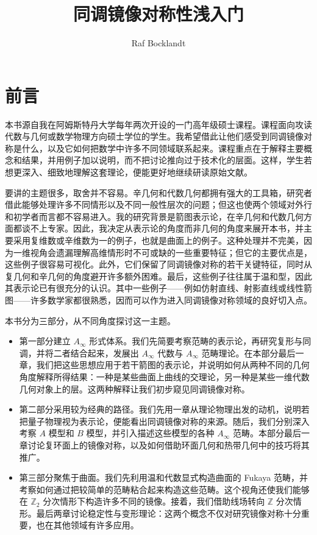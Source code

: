 \documentclass[lang=cn,cm,11pt,scheme=chinese]{elegantbook}
\title{同调镜像对称性浅入门}
\author{Raf Bocklandt}
\date{}
\begin{document}
\maketitle
\hypersetup{pageanchor=true}
\frontmatter
\tableofcontents

\chapter*{前言}
本书源自我在阿姆斯特丹大学每年两次开设的一门高年级硕士课程。课程面向攻读代数与几何或数学物理方向硕士学位的学生。我希望借此让他们感受到同调镜像对称是什么，以及它如何把数学中许多不同领域联系起来。课程重点在于解释主要概念和结果，并用例子加以说明，而不把讨论推向过于技术化的层面。这样，学生若想更深入、细致地理解这套理论，便能更好地继续研读原始文献。

要讲的主题很多，取舍并不容易。辛几何和代数几何都拥有强大的工具箱，研究者借此能够处理许多不同情形以及不同一般性层次的问题；但这也使两个领域对外行和初学者而言都不容易进入。我的研究背景是箭图表示论，在辛几何和代数几何方面都谈不上专家。因此，我决定从表示论的角度而非几何的角度来展开本书，并主要采用复维数或辛维数为一的例子，也就是曲面上的例子。这种处理并不完美，因为一维视角会遗漏理解高维情形时不可或缺的一些重要特征；但它的主要优点是，这些例子很容易可视化。此外，它们保留了同调镜像对称的若干关键特征，同时从复几何和辛几何的角度避开许多额外困难。最后，这些例子往往属于温和型，因此其表示论已有很充分的认识。其中一些例子——例如仿射直线、射影直线或线性箭图——许多数学家都很熟悉，因而可以作为进入同调镜像对称领域的良好切入点。

本书分为三部分，从不同角度探讨这一主题。

\begin{itemize}
  \item 第一部分建立 $A_\infty$ 形式体系。我们先简要考察范畴的表示论，再研究复形与同调，并将二者结合起来，发展出 $A_\infty$ 代数与 $A_\infty$ 范畴理论。在本部分最后一章，我们把这些思想应用于若干箭图的表示论，并说明如何从两种不同的几何角度解释所得结果：一种是某些曲面上曲线的交理论，另一种是某些一维代数几何对象上的层。这两种解释让我们初步窥见同调镜像对称。
  \item 第二部分采用较为经典的路径。我们先用一章从理论物理出发的动机，说明若把量子物理视为表示论，便能看出同调镜像对称的来源。随后，我们分别深入考察 $A$ 模型和 $B$ 模型，并引入描述这些模型的各种 $A_\infty$ 范畴。本部分最后一章讨论复环面上的镜像对称，以及如何借助环面几何和热带几何中的技巧将其推广。
  \item 第三部分聚焦于曲面。我们先利用温和代数显式构造曲面的 Fukaya 范畴，并考察如何通过把较简单的范畴粘合起来构造这些范畴。这个视角还使我们能够在 $\mathbb{Z}_2$ 分次情形下构造许多不同的镜像。接着，我们借助线场转向 $\mathbb{Z}$ 分次情形。最后两章讨论稳定性与变形理论：这两个概念不仅对研究镜像对称十分重要，也在其他领域有许多应用。
\end{itemize}
\end{document}

